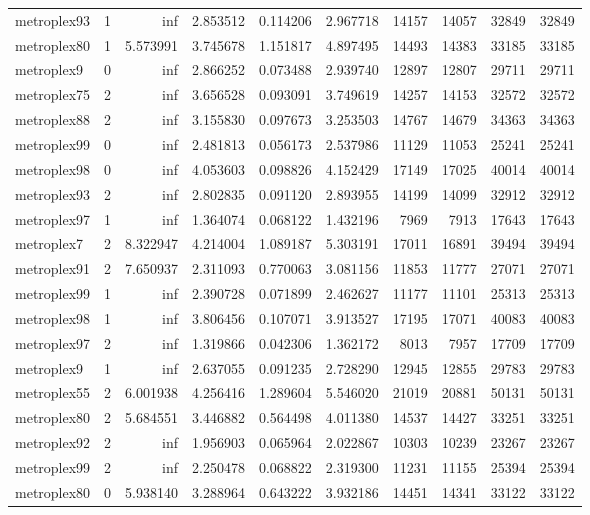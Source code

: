 \begin{longtable}{|l|r|r|r|r|r|r|r|r|r|}
metroplex93 & 1 & inf & 2.853512 & 0.114206 & 2.967718 & 14157 & 14057 & 32849 & 32849 \\
metroplex80 & 1 & 5.573991 & 3.745678 & 1.151817 & 4.897495 & 14493 & 14383 & 33185 & 33185 \\
metroplex9 & 0 & inf & 2.866252 & 0.073488 & 2.939740 & 12897 & 12807 & 29711 & 29711 \\
metroplex75 & 2 & inf & 3.656528 & 0.093091 & 3.749619 & 14257 & 14153 & 32572 & 32572 \\
metroplex88 & 2 & inf & 3.155830 & 0.097673 & 3.253503 & 14767 & 14679 & 34363 & 34363 \\
metroplex99 & 0 & inf & 2.481813 & 0.056173 & 2.537986 & 11129 & 11053 & 25241 & 25241 \\
metroplex98 & 0 & inf & 4.053603 & 0.098826 & 4.152429 & 17149 & 17025 & 40014 & 40014 \\
metroplex93 & 2 & inf & 2.802835 & 0.091120 & 2.893955 & 14199 & 14099 & 32912 & 32912 \\
metroplex97 & 1 & inf & 1.364074 & 0.068122 & 1.432196 & 7969 & 7913 & 17643 & 17643 \\
metroplex7 & 2 & 8.322947 & 4.214004 & 1.089187 & 5.303191 & 17011 & 16891 & 39494 & 39494 \\
metroplex91 & 2 & 7.650937 & 2.311093 & 0.770063 & 3.081156 & 11853 & 11777 & 27071 & 27071 \\
metroplex99 & 1 & inf & 2.390728 & 0.071899 & 2.462627 & 11177 & 11101 & 25313 & 25313 \\
metroplex98 & 1 & inf & 3.806456 & 0.107071 & 3.913527 & 17195 & 17071 & 40083 & 40083 \\
metroplex97 & 2 & inf & 1.319866 & 0.042306 & 1.362172 & 8013 & 7957 & 17709 & 17709 \\
metroplex9 & 1 & inf & 2.637055 & 0.091235 & 2.728290 & 12945 & 12855 & 29783 & 29783 \\
metroplex55 & 2 & 6.001938 & 4.256416 & 1.289604 & 5.546020 & 21019 & 20881 & 50131 & 50131 \\
metroplex80 & 2 & 5.684551 & 3.446882 & 0.564498 & 4.011380 & 14537 & 14427 & 33251 & 33251 \\
metroplex92 & 2 & inf & 1.956903 & 0.065964 & 2.022867 & 10303 & 10239 & 23267 & 23267 \\
metroplex99 & 2 & inf & 2.250478 & 0.068822 & 2.319300 & 11231 & 11155 & 25394 & 25394 \\
metroplex80 & 0 & 5.938140 & 3.288964 & 0.643222 & 3.932186 & 14451 & 14341 & 33122 & 33122 \\

\end{longtable}
